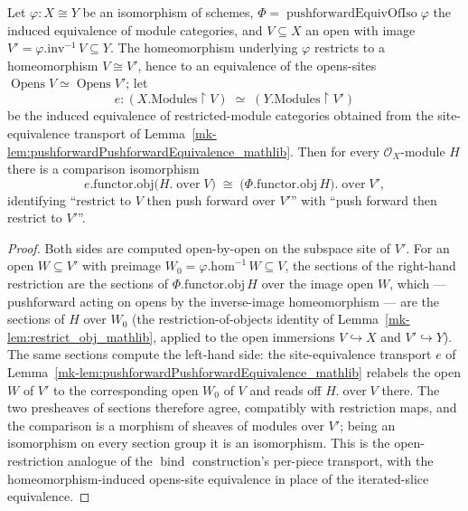 \begin{lemma}
  \label{mk-lem:pushforward_commutes_restriction}
  Let \(\varphi : X \cong Y\) be an isomorphism of schemes,
  \(\Phi = \operatorname{pushforwardEquivOfIso}\varphi\) the induced equivalence of module categories,
  and \(V \subseteq X\) an open with image \(V' = \varphi.\mathrm{inv}^{-1}\,V \subseteq Y\). The
  homeomorphism underlying \(\varphi\) restricts to a homeomorphism \(V \cong V'\), hence to an
  equivalence of the opens-sites \(\operatorname{Opens} V \simeq \operatorname{Opens} V'\); let
  \[
    e : (X.\mathrm{Modules} \!\restriction\! V) \;\simeq\; (Y.\mathrm{Modules} \!\restriction\! V')
  \]
  be the induced equivalence of restricted-module categories obtained from the site-equivalence
  transport of Lemma~\ref{mk-lem:pushforwardPushforwardEquivalence_mathlib}. Then for every
  \(\mathcal{O}_X\)-module \(H\) there is a comparison isomorphism
  \[
    e.\mathrm{functor}.\mathrm{obj}\bigl(H.\operatorname{over} V\bigr)
      \;\cong\;
    \bigl(\Phi.\mathrm{functor}.\mathrm{obj}\, H\bigr).\operatorname{over} V',
  \]
  identifying ``restrict to \(V\) then push forward over \(V'\)'' with ``push forward then restrict to
  \(V'\)''.
\end{lemma}
\begin{proof}
  Both sides are computed open-by-open on the subspace site of \(V'\). For an open
  \(W \subseteq V'\) with preimage \(W_0 = \varphi.\mathrm{hom}^{-1}\,W \subseteq V\), the sections of the
  right-hand restriction are the sections of \(\Phi.\mathrm{functor}.\mathrm{obj}\, H\) over the image
  open \(W\), which — pushforward acting on opens by the inverse-image homeomorphism — are the sections
  of \(H\) over \(W_0\) (the restriction-of-objects identity of Lemma~\ref{mk-lem:restrict_obj_mathlib},
  applied to the open immersions \(V \hookrightarrow X\) and \(V' \hookrightarrow Y\)). The same
  sections compute the left-hand side: the site-equivalence transport
  \(e\) of Lemma~\ref{mk-lem:pushforwardPushforwardEquivalence_mathlib} relabels the open \(W\) of \(V'\)
  to the corresponding open \(W_0\) of \(V\) and reads off \(H.\operatorname{over} V\) there. The two
  presheaves of sections therefore agree, compatibly with restriction maps, and the comparison is a
  morphism of sheaves of modules over \(V'\); being an isomorphism on every section group it is an
  isomorphism. This is the open-restriction analogue of the \(\operatorname{bind}\) construction's
  per-piece transport, with the homeomorphism-induced opens-site equivalence in place of the
  iterated-slice equivalence.
\end{proof}

